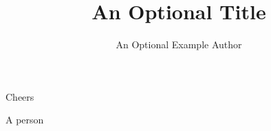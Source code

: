 \documentclass{dragonfly-letter}
\title{An Optional Title}
\author{An Optional Example Author}
\begin{document}

\lipsum[1-7]

Cheers

A person
\end{document}
